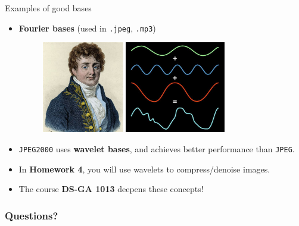 \documentclass{beamer}
\begin{document}
\begin{frame}[t]{Examples of good bases}
	\begin{itemize}
		\item \textbf{Fourier bases} (used in \texttt{.jpeg}, \texttt{.mp3})
			\begin{figure}
				\includegraphics[height=4cm]{./fourier.jpeg}
				\hspace{1cm}
				\includegraphics[height=4cm]{./fourier_dec.jpg}
			\end{figure}

		\item \texttt{JPEG2000} uses \textbf{wavelet bases}, and achieves better performance than \texttt{JPEG}.
		\item In \textbf{Homework 4}, you will use wavelets to compress/denoise images.
		\item The course \textbf{DS-GA 1013} deepens these concepts!
	\end{itemize}
\end{frame}
\appendix
\backupbegin
\begin{frame}
	\frametitle{Questions?}
\end{frame}
\backupend
\end{document}
